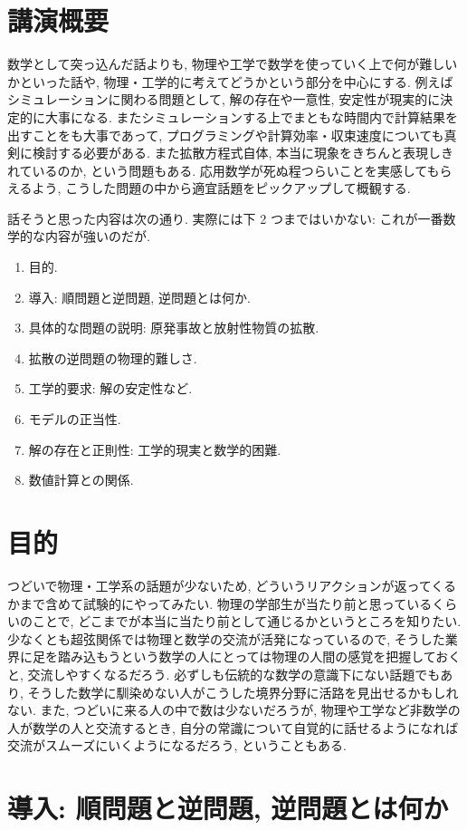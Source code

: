 \documentclass[openany, a4paper, oneside]{jsbook}
\begin{document}
\section{講演概要}

数学として突っ込んだ話よりも, 物理や工学で数学を使っていく上で何が難しいかといった話や,
物理・工学的に考えてどうかという部分を中心にする.
例えばシミュレーションに関わる問題として, 解の存在や一意性, 安定性が現実的に決定的に大事になる.
またシミュレーションする上でまともな時間内で計算結果を出すことをも大事であって,
プログラミングや計算効率・収束速度についても真剣に検討する必要がある.
また拡散方程式自体, 本当に現象をきちんと表現しきれているのか, という問題もある.
応用数学が死ぬ程つらいことを実感してもらえるよう,
こうした問題の中から適宜話題をピックアップして概観する.

話そうと思った内容は次の通り.
実際には下 2 つまではいかない: これが一番数学的な内容が強いのだが.
\begin{enumerate}
\item 目的.
\item 導入: 順問題と逆問題, 逆問題とは何か.
\item 具体的な問題の説明: 原発事故と放射性物質の拡散.
\item 拡散の逆問題の物理的難しさ.
\item 工学的要求: 解の安定性など.
\item モデルの正当性.
\item 解の存在と正則性: 工学的現実と数学的困難.
\item 数値計算との関係.
\end{enumerate}
\section{目的}

つどいで物理・工学系の話題が少ないため, どういうリアクションが返ってくるかまで含めて試験的にやってみたい.
物理の学部生が当たり前と思っているくらいのことで, どこまでが本当に当たり前として通じるかというところを知りたい.
少なくとも超弦関係では物理と数学の交流が活発になっているので,
そうした業界に足を踏み込もうという数学の人にとっては物理の人間の感覚を把握しておくと, 交流しやすくなるだろう.
必ずしも伝統的な数学の意識下にない話題でもあり, そうした数学に馴染めない人がこうした境界分野に活路を見出せるかもしれない.
また, つどいに来る人の中で数は少ないだろうが, 物理や工学など非数学の人が数学の人と交流するとき,
自分の常識について自覚的に話せるようになれば交流がスムーズにいくようになるだろう, ということもある.
\section{導入: 順問題と逆問題, 逆問題とは何か}
\end{document}
